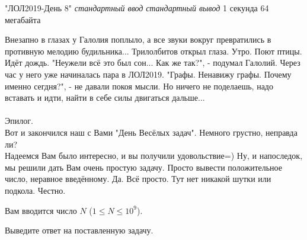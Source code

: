 \begin{problem}%
{"ЛОЛ2019-День 8"}%
{\textsl{стандартный ввод}}%
{\textsl{стандартный вывод}}%
{1 секунда}%
{64 мегабайта}{}

Внезапно в глазах у Галолия поплыло, а все звуки вокруг превратились в противную мелодию будильника... Трилолбитов открыл глаза. Утро. Поют птицы. Идёт дождь. "Неужели всё это был сон... Как же так?", - подумал Галолий. Через час у него уже начиналась пара в ЛОЛ2019. "Графы. Ненавижу графы. Почему именно сегдня?", - не давали покоя мысли. Но ничего не поделаешь, надо вставать и идти, найти в себе силы двигаться дальше... \\
\\
Эпилог.\\

Вот и закончился наш с Вами "День Весёлых задач". Немного грустно, неправда ли? \\
Надеемся Вам было интересно, и вы получили удовольствие=)
Ну, и напоследок, мы решили дать Вам очень простую задачу. Просто вывести положительное число, неравное введённому. Да. Всё просто. Тут нет никакой шутки или подкола. Честно.

\InputFile

Вам вводится число $N$ ($1 \le N \le 10^9$).

\OutputFile

Выведите ответ на поставленную задачу.

\Examples

\begin{example}
%
\end{example}
\end{problem}
